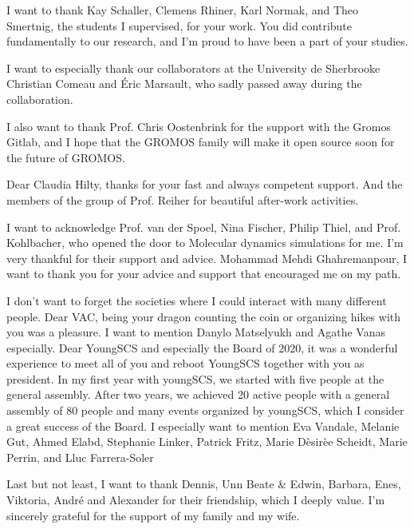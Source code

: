 I want to thank Kay Schaller, Clemens Rhiner, Karl Normak, and Theo Smertnig, the students I supervised, for your work. You did contribute fundamentally to our research, and I'm proud to have been a part of your studies.

I want to especially thank our collaborators at the University de Sherbrooke Christian Comeau and {\' E}ric Marsault, who sadly passed away during the collaboration.

I also want to thank Prof. Chris Oostenbrink for the support with the Gromos Gitlab, and I hope that the GROMOS family will make it open source soon for the future of GROMOS.


Dear Claudia Hilty, thanks for your fast and always competent support. And the members of the group of Prof. Reiher for beautiful after-work activities.

I want to acknowledge Prof. van der Spoel, Nina Fischer, Philip Thiel, and Prof. Kohlbacher, who opened the door to Molecular dynamics simulations for me. I'm very thankful for their support and advice.  
Mohammad Mehdi Ghahremanpour, I want to thank you for your advice and support that encouraged me on my path.

I don't want to forget the societies where I could interact with many different people.
Dear VAC, being your dragon counting the coin or organizing hikes with you was a pleasure. I want to mention Danylo Matselyukh and Agathe Vanas especially. 
Dear YoungSCS and especially the Board of 2020, it was a wonderful experience to meet all of you and reboot YoungSCS together with you as president. In my first year with youngSCS, we started with five people at the general assembly. After two years, we achieved 20 active people with a general assembly of 80 people and many events organized by youngSCS, which I consider a great success of the Board. I especially want to mention Eva Vandale, Melanie Gut, Ahmed Elabd, Stephanie Linker, Patrick Fritz, Marie D{\`e}sir{\`e}e Scheidt, Marie Perrin, and Lluc Farrera-Soler

Last but not least, I want to thank Dennis, Unn Beate \& Edwin, Barbara, Enes, Viktoria, Andr{\'e} and Alexander for their friendship, which I deeply value.
I'm sincerely grateful for the support of my family and my wife.

\begin{center}
    \begin{minipage}[t]{.5\linewidth}
    \end{minipage}
\end{center}
